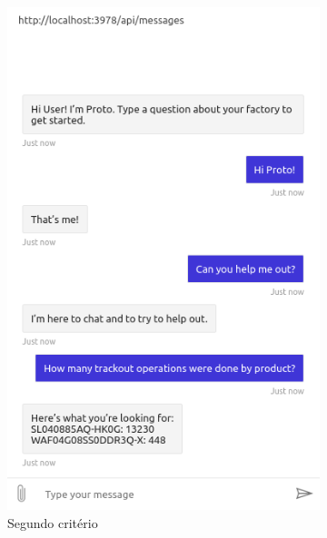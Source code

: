 \begin{figure}
\begin{subfigure}[t]{.48\textwidth}
        \includegraphics[width=.85\textwidth]{ch06/assets/response02.png}
        \caption{Segundo critério}
     \end{subfigure}
     \bigbreak
     \begin{subfigure}[t]{.48\textwidth}
        \centering

\end{subfigure}
\end{figure}
